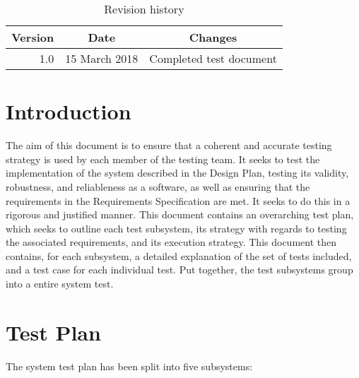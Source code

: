 \documentclass[12pt]{article}
\newcounter{req ID}
\begin{document}
                \begin{table}[htbp]
                    \caption{Revision history}
                    \begin{center}
                        \begin{tabular}{|r | c| c |}
                            \hline
                            Version & Date & Changes \\
                            \hline
                            1.0 & 15 March 2018 & Completed test document \\
                            \hline
                        \end{tabular}
                    \end{center}
                \end{table}


                \tableofcontents
\listoffigures
\clearpage
\listoftables

\clearpage

\section{Introduction}

The aim of this document is to ensure that a coherent and accurate testing strategy is used by each member of the testing team. It seeks to test the implementation of the system described in the Design Plan, testing its validity, robustness, and reliableness as a software, as well as ensuring that the requirements in the Requirements Specification are met. It seeks to do this in a rigorous and justified manner.
This document contains an overarching test plan, which seeks to outline each test subsystem, its strategy with regards to testing the associated requirements, and its execution strategy. This document then contains, for each subsystem, a detailed explanation of the set of tests included, and a test case for each individual test. Put together, the test subsystems group into a entire system test.

\section{Test Plan}

The system test plan has been split into five subsystems:
\end{document}
